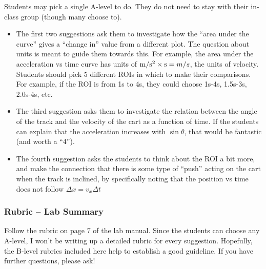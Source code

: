 \documentclass[fleqn,letterpaper]{article}
\begin{document}
Students may pick a single A-level to do.  They do not need to stay with their in-class group (though many choose to).  

\begin{itemize}
 \item{The first two suggestions ask them to investigate how the ``area under the curve'' gives a ``change in'' value from a different plot.  The question about units is meant to guide them towards this.  For example, the area under the acceleration vs time curve has units of ${\rm m/s^2} \times {\rm s} = m/s$, the units of velocity.  Students should pick 5 different ROIs in which to make their comparisons.  For example, if the ROI is from 1s to 4s, they could choose 1s-4s, 1.5s-3s, 2.0s-4s, etc.}
 \item{The third suggestion asks them to investigate the relation between the angle of the track and the velocity of the cart as a function of time.  If the students can explain that the acceleration increases with $\sin \theta$, that would be fantastic (and worth a ``4'').}
 \item{The fourth suggestion asks the students to think about the ROI a bit more, and make the connection that there is some type of ``push'' acting on the cart when the track is inclined, by specifically noting that the position vs time does not follow $\Delta x = v_x \Delta t$}
\end{itemize}

\subsubsection*{Rubric -- Lab Summary}

Follow the rubric on page 7 of the lab manual.  Since the students can choose any A-level, I won't be writing up a detailed rubric for every suggestion.  Hopefully, the B-level rubrics included here help to establish a good guideline.  If you have further questions, please ask!

\label{LastPage}
\end{document}
